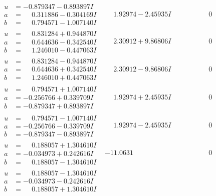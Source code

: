 \documentclass[1p]{elsarticle_modified}
\theoremstyle{definition}
\begin{document}
$$\begin{array}{c|c|c}
\begin{aligned}
u &= -0.879347 - 0.893897 I \\
a &= \phantom{-}0.311886 - 0.304169 I \\
b &= \phantom{-}0.794571 - 1.007140 I\end{aligned}
 & \phantom{-}1.92974 - 2.45935 I & \phantom{-0.000000 } 0 \\ \hline\begin{aligned}
u &= \phantom{-}0.831284 + 0.944870 I \\
a &= \phantom{-}0.644636 - 0.342540 I \\
b &= \phantom{-}1.246010 - 0.447063 I\end{aligned}
 & \phantom{-}2.30912 + 9.86806 I & \phantom{-0.000000 } 0 \\ \hline\begin{aligned}
u &= \phantom{-}0.831284 - 0.944870 I \\
a &= \phantom{-}0.644636 + 0.342540 I \\
b &= \phantom{-}1.246010 + 0.447063 I\end{aligned}
 & \phantom{-}2.30912 - 9.86806 I & \phantom{-0.000000 } 0 \\ \hline\begin{aligned}
u &= \phantom{-}0.794571 + 1.007140 I \\
a &= -0.256766 + 0.339709 I \\
b &= -0.879347 + 0.893897 I\end{aligned}
 & \phantom{-}1.92974 + 2.45935 I & \phantom{-0.000000 } 0 \\ \hline\begin{aligned}
u &= \phantom{-}0.794571 - 1.007140 I \\
a &= -0.256766 - 0.339709 I \\
b &= -0.879347 - 0.893897 I\end{aligned}
 & \phantom{-}1.92974 - 2.45935 I & \phantom{-0.000000 } 0 \\ \hline\begin{aligned}
u &= \phantom{-}0.188057 + 1.304610 I \\
a &= -0.034973 + 0.242616 I \\
b &= \phantom{-}0.188057 - 1.304610 I\end{aligned}
 & -11.0631\phantom{ +0.000000I} & \phantom{-0.000000 } 0 \\ \hline\begin{aligned}
u &= \phantom{-}0.188057 - 1.304610 I \\
a &= -0.034973 - 0.242616 I \\
b &= \phantom{-}0.188057 + 1.304610 I\end{aligned}

\end{array}$$
\end{document}
